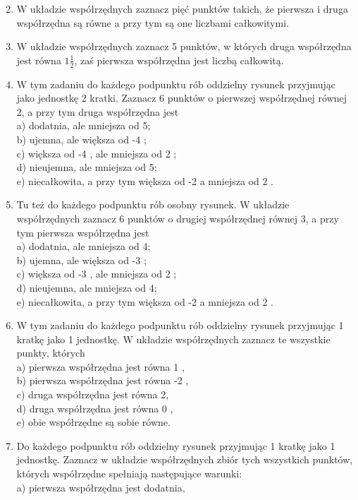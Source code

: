 \documentclass[10pt]{article}
\begin{document}
\begin{enumerate}
  \setcounter{enumi}{1}
  \item W układzie współrzędnych zaznacz pięć punktów takich, że pierwsza i druga współrzędna są równe a przy tym są one liczbami całkowitymi.
  \item W układzie współrzędnych zaznacz 5 punktów, w których druga współrzędna jest równa \(1 \frac{1}{2}\), zaś pierwsza współrzędna jest liczbą całkowitą.
  \item W tym zadaniu do każdego podpunktu rób oddzielny rysunek przyjmując jako jednostkę 2 kratki. Zaznacz 6 punktów o pierwszej współrzędnej równej 2, a przy tym druga współrzędna jest\\
a) dodatnia, ale mniejsza od 5;\\
b) ujemna, ale większa od -4 ;\\
c) większa od -4 , ale mniejsza od 2 ;\\
d) nieujemna, ale mniejsza od 5;\\
e) niecałkowita, a przy tym większa od -2 a mniejsza od 2 .
  \item Tu też do każdego podpunktu rób osobny rysunek. W układzie współrzędnych zaznacz 6 punktów o drugiej współrzędnej równej 3, a przy tym pierwsza współrzędna jest\\
a) dodatnia, ale mniejsza od 4;\\
b) ujemna, ale większa od -3 ;\\
c) większa od -3 , ale mniejsza od 2 ;\\
d) nieujemna, ale mniejsza od 4;\\
e) niecałkowita, a przy tym większa od -2 a mniejsza od 2 .
  \item W tym zadaniu do każdego podpunktu rób oddzielny rysunek przyjmując 1 kratkę jako 1 jednostkę. W układzie współrzędnych zaznacz te wszystkie punkty, których\\
a) pierwsza współrzędna jest równa 1 ,\\
b) pierwsza współrzędna jest równa -2 ,\\
c) druga współrzędna jest równa 2,\\
d) druga współrzędna jest równa 0 ,\\
e) obie współrzędne są sobie równe.
  \item Do każdego podpunktu rób oddzielny rysunek przyjmując 1 kratkę jako 1 jednostkę. Zaznacz w układzie współrzędnych zbiór tych wszystkich punktów, których współrzędne spełniają następujące warunki:\\
a) pierwsza współrzędna jest dodatnia,\\

\end{enumerate}
\end{document}
